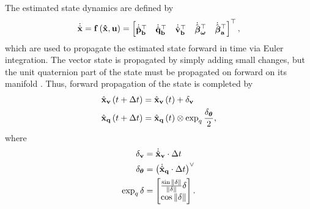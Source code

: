 \documentclass[english]{article}
\begin{document}
The estimated state dynamics are defined by
\begin{equation}
\dot{\hat{\bf x}} = f\left( \hat{\bf x}, {\bf u} \right) = \begin{bmatrix} \dot{\hat{\bf p}}_b^\top & \dot{\hat{\bf q}}_b^\top & \dot{\hat{\bf v}}_b^\top & \dot{\hat{\boldsymbol \beta}}_{\boldsymbol \omega}^\top & \dot{\hat{\boldsymbol \beta}}_{\bf a}^\top \end{bmatrix}^\top,
\end{equation}
which are used to propagate the estimated state forward in time via Euler integration. The vector state is propagated by simply adding small changes, but the unit quaternion part of the state must be propagated on forward on its manifold \cite{key-1}. Thus, forward propagation of the state is completed by
\begin{align}
\hat{{\bf x}}_{\bf v}\left(t+\Delta t\right) & = \hat{\bf x}_{\bf v}\left(t\right) + \delta_{\bf v} \\
\hat{{\bf x}}_{\bf q}\left(t+\Delta t\right) & = \hat{{\bf x}}_{\bf q}\left(t\right) \otimes \exp_q \frac{\delta_{\boldsymbol \theta}}{2},
\end{align}
where
\begin{align}
\delta_{\bf v} & = \dot{\hat{{\bf x}}}_{\bf v} \cdot \Delta t \\
\delta_{\boldsymbol \theta} & = \left(\dot{\hat{{\bf x}}}_{\bf q} \cdot \Delta t \right)^\lor \\
\exp_q{\delta} & = \begin{bmatrix} \frac{\sin{\lVert \delta \rVert}}{\lVert \delta \rVert}\delta \\ \cos{\lVert \delta \rVert} \end{bmatrix}.
\end{align}
\end{document}
